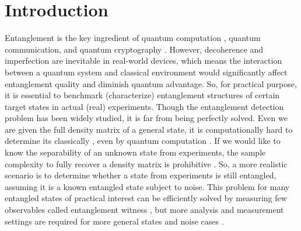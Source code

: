 \documentclass[
aps,
pra,
twocolumn,
floatfix,
]{revtex4-2}
\theoremstyle{plain}
\theoremstyle{definition}
\begin{document}
\section{Introduction}
Entanglement \cite{horodeckiQuantumEntanglement2009} is the key ingredient of quantum computation \cite{briegelMeasurementbasedQuantumComputation2009}, quantum communication, and quantum cryptography \cite{xuSecureQuantumKey2020}.
However, decoherence and imperfection are inevitable in real-world devices, which means the interaction between a quantum system and classical environment would significantly affect entanglement quality and diminish quantum advantage. 
So, for practical purpose, it is essential to benchmark (characterize) entanglement structures of certain target states in actual (real) experiments.
Though the entanglement detection problem \cite{guhneEntanglementDetection2009} has been widely studied,
it is far from being perfectly solved.
Even we are given the full density matrix of a general state, it is computationally hard to determine its  classically \cite{gurvitsClassicalDeterministicComplexity2003}, even by quantum computation \cite{gutoskiQuantumInteractiveProofs2015}.
If we would like to know the separability of an unknown state from experiments, the sample complexity to fully recover a density matrix is prohibitive \cite{haahSampleoptimalTomographyQuantum2017} \cite{odonnellEfficientQuantumTomography2016}.
So, a more realistic scenario is to determine whether a state from experiments is still entangled, assuming it is a known entangled state subject to noise.
This problem for many entangled states of practical interest can be efficiently solved by measuring few observables called entanglement witness \cite{bourennaneWitnessingMultipartiteEntanglement2004} \cite{tothDetectingGenuineMultipartite2005} \cite{tothEntanglementDetectionStabilizer2005}, but more analysis and measurement settings are required for more general states and noise cases \cite{guhneNonlinearEntanglementWitnesses2006} \cite{zhouEntanglementDetectionCoherent2020} \cite{zhangEfficientEntanglementGeneration2021}.
\end{document}
